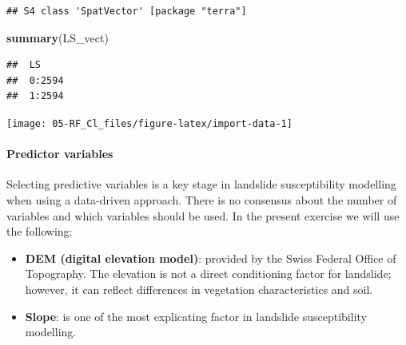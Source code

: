 \documentclass[
]{article}
\newenvironment{Shaded}{\begin{snugshade}}{\end{snugshade}}
\newcommand{\AttributeTok}[1]{\textcolor[rgb]{0.13,0.29,0.53}{#1}}
\newcommand{\CommentTok}[1]{\textcolor[rgb]{0.56,0.35,0.01}{\textit{#1}}}
\newcommand{\ConstantTok}[1]{\textcolor[rgb]{0.56,0.35,0.01}{#1}}
\newcommand{\DecValTok}[1]{\textcolor[rgb]{0.00,0.00,0.81}{#1}}
\newcommand{\FloatTok}[1]{\textcolor[rgb]{0.00,0.00,0.81}{#1}}
\newcommand{\FunctionTok}[1]{\textcolor[rgb]{0.13,0.29,0.53}{\textbf{#1}}}
\newcommand{\NormalTok}[1]{#1}
\newcommand{\SpecialCharTok}[1]{\textcolor[rgb]{0.81,0.36,0.00}{\textbf{#1}}}
\newcommand{\StringTok}[1]{\textcolor[rgb]{0.31,0.60,0.02}{#1}}
\begin{document}
\begin{verbatim}
## S4 class 'SpatVector' [package "terra"]
\end{verbatim}

\begin{Shaded}
\begin{Highlighting}[]
\FunctionTok{summary}\NormalTok{(LS\_vect)}
\end{Highlighting}
\end{Shaded}

\begin{verbatim}
##  LS      
##  0:2594  
##  1:2594
\end{verbatim}

\begin{Shaded}
\end{Shaded}

\begin{center}\texttt{[image: 05-RF\_Cl\_files/figure-latex/import-data-1]} \end{center}

\paragraph{Predictor variables}\label{predictor-variables}

Selecting predictive variables is a key stage in landslide susceptibility modelling when using a data-driven approach.
There is no consensus about the number of variables and which variables should be used.
In the present exercise we will use the following:

\begin{itemize}
\item
  \textbf{DEM (digital elevation model)}: provided by the Swiss Federal Office of Topography.
  The elevation is not a direct conditioning factor for landslide; however, it can reflect differences in vegetation characteristics and soil.
\item
  \textbf{Slope}: is one of the most explicating factor in landslide susceptibility modelling.
\end{itemize}
\end{document}
